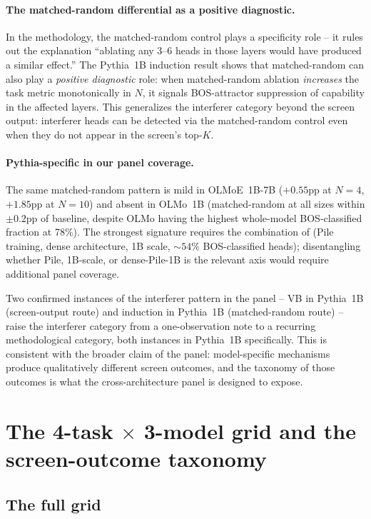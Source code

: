 \documentclass[11pt]{article}
\begin{document}
\paragraph{The matched-random differential as a positive diagnostic.}
In the methodology, the matched-random control plays a specificity role -- it rules out the explanation ``ablating any 3--6 heads in those layers would have produced a similar effect.'' The Pythia~1B induction result shows that matched-random can also play a \emph{positive diagnostic} role: when matched-random ablation \emph{increases} the task metric monotonically in $N$, it signals BOS-attractor suppression of capability in the affected layers. This generalizes the interferer category beyond the screen output: interferer heads can be detected via the matched-random control even when they do not appear in the screen's top-$K$.

\paragraph{Pythia-specific in our panel coverage.}
The same matched-random pattern is mild in OLMoE~1B-7B ($+0.55$pp at $N=4$, $+1.85$pp at $N=10$) and absent in OLMo~1B (matched-random at all sizes within $\pm 0.2$pp of baseline, despite OLMo having the highest whole-model BOS-classified fraction at 78\%). The strongest signature requires the combination of (Pile training, dense architecture, 1B scale, $\sim 54\%$ BOS-classified heads); disentangling whether Pile, 1B-scale, or dense-Pile-1B is the relevant axis would require additional panel coverage.

Two confirmed instances of the interferer pattern in the panel -- VB in Pythia~1B (screen-output route) and induction in Pythia~1B (matched-random route) -- raise the interferer category from a one-observation note to a recurring methodological category, both instances in Pythia~1B specifically. This is consistent with the broader claim of the panel: model-specific mechanisms produce qualitatively different screen outcomes, and the taxonomy of those outcomes is what the cross-architecture panel is designed to expose.

\section{The 4-task $\times$ 3-model grid and the screen-outcome taxonomy}
\label{sec:taxonomy}

\subsection{The full grid}
\end{document}
